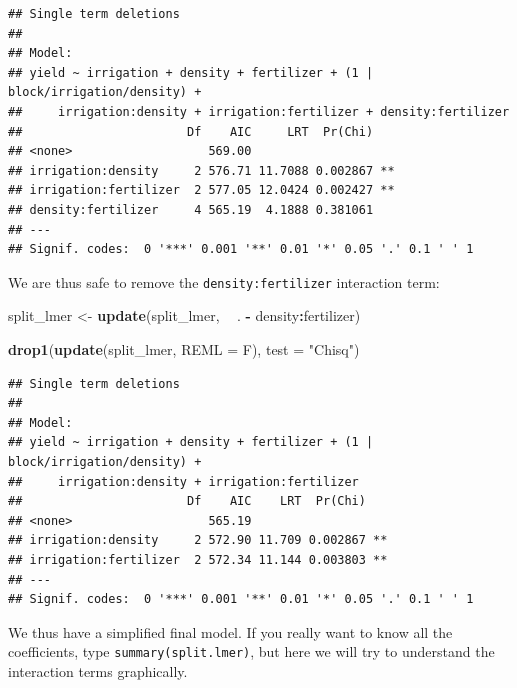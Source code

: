 \documentclass[]{book}
\newenvironment{Shaded}{\begin{snugshade}}{\end{snugshade}}
\newcommand{\KeywordTok}[1]{\textcolor[rgb]{0.13,0.29,0.53}{\textbf{#1}}}
\newcommand{\DataTypeTok}[1]{\textcolor[rgb]{0.13,0.29,0.53}{#1}}
\newcommand{\StringTok}[1]{\textcolor[rgb]{0.31,0.60,0.02}{#1}}
\newcommand{\OperatorTok}[1]{\textcolor[rgb]{0.81,0.36,0.00}{\textbf{#1}}}
\newcommand{\NormalTok}[1]{#1}
\theoremstyle{definition}
\theoremstyle{definition}
\theoremstyle{definition}
\theoremstyle{remark}
\begin{document}
\begin{verbatim}
## Single term deletions
## 
## Model:
## yield ~ irrigation + density + fertilizer + (1 | block/irrigation/density) + 
##     irrigation:density + irrigation:fertilizer + density:fertilizer
##                       Df    AIC     LRT  Pr(Chi)   
## <none>                   569.00                    
## irrigation:density     2 576.71 11.7088 0.002867 **
## irrigation:fertilizer  2 577.05 12.0424 0.002427 **
## density:fertilizer     4 565.19  4.1888 0.381061   
## ---
## Signif. codes:  0 '***' 0.001 '**' 0.01 '*' 0.05 '.' 0.1 ' ' 1
\end{verbatim}

We are thus safe to remove the \texttt{density:fertilizer} interaction
term:

\begin{Shaded}
\begin{Highlighting}[]
\NormalTok{split_lmer <-}\StringTok{ }\KeywordTok{update}\NormalTok{(split_lmer, }\OperatorTok{~}\StringTok{ }\NormalTok{. }\OperatorTok{-}\StringTok{ }\NormalTok{density}\OperatorTok{:}\NormalTok{fertilizer)}
\end{Highlighting}
\end{Shaded}

\newpage

\begin{Shaded}
\begin{Highlighting}[]
\KeywordTok{drop1}\NormalTok{(}\KeywordTok{update}\NormalTok{(split_lmer, }\DataTypeTok{REML =}\NormalTok{ F), }\DataTypeTok{test =} \StringTok{"Chisq"}\NormalTok{)}
\end{Highlighting}
\end{Shaded}

\begin{verbatim}
## Single term deletions
## 
## Model:
## yield ~ irrigation + density + fertilizer + (1 | block/irrigation/density) + 
##     irrigation:density + irrigation:fertilizer
##                       Df    AIC    LRT  Pr(Chi)   
## <none>                   565.19                   
## irrigation:density     2 572.90 11.709 0.002867 **
## irrigation:fertilizer  2 572.34 11.144 0.003803 **
## ---
## Signif. codes:  0 '***' 0.001 '**' 0.01 '*' 0.05 '.' 0.1 ' ' 1
\end{verbatim}

We thus have a simplified final model. If you really want to know all
the coefficients, type \texttt{summary(split.lmer)}, but here we will
try to understand the interaction terms graphically.
\end{document}
